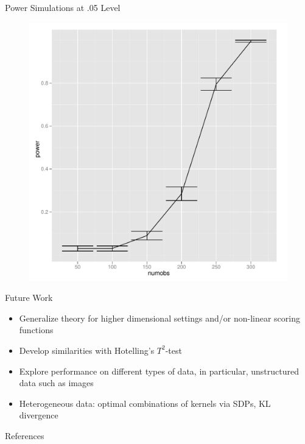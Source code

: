 \documentclass{beamer}
\begin{document}
\begin{frame}{Power Simulations at .05 Level}
   \begin{figure}[!ht]
   \centering
   \includegraphics[scale=.4]{pres7.pdf}  
 \end{figure}
\end{frame}

\begin{frame}{Future Work}
  \begin{itemize}
  \item Generalize theory for higher dimensional settings and/or
    non-linear scoring functions \pause
  \item Develop similarities with Hotelling's $T^2$-test \pause
  \item Explore performance on different types of data, in particular,
    unstructured data such as images \pause
  \item Heterogeneous data: optimal combinations of kernels
    via SDPs, KL divergence \pause
  \end{itemize}
\end{frame}

\begin{frame}[allowframebreaks]{References}
  
  
\end{frame}
\end{document}
